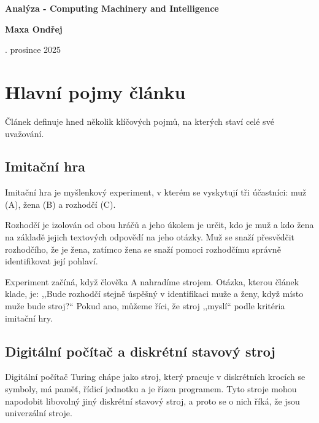 \documentclass[a4paper,oneside,11pt,usenames,dvipsnames]{article}
\begin{document}
\thispagestyle{empty}
\begin {center}
	\vspace *{10mm}
	{\Huge \sffamily \bfseries Analýza - Computing Machinery and Intelligence}

	\vspace *{20mm}
	{\Large \sffamily \bfseries Maxa Ondřej}

	\vspace *{7.5mm}
	{\large {}. prosince 2025}
\end {center}

\begin{abstract}
	Článek ,,Computing Machinery and Intelligence`` (1950) představuje klíčový text zakládající oblast umělé inteligence. Zabývá se filozofickou otázku jestli ,,Mohou stroje myslet?{}`` a představuje nám Turingový test (v textu se používá slovní spojení ,,imitační hra``). Hlavní postavou hry je rozhodčí, který rozlišuje mezi odpověďmi člověka a stroje na základě textové komunikace. Dnes zůstává Turingův test ikonickou metrikou a položil základy pro současnou popularitu AI.
\end{abstract}

\setlength{\parskip}{1ex plus 0.25ex minus 0.125ex}
  
\section{Hlavní pojmy článku}
\label{sec:uvod}

Článek definuje hned několik klíčových pojmů, na kterých staví celé své uvažování.

\subsection{Imitační hra}
\label{subsec:imitacni-hra}
Imitační hra je myšlenkový experiment, v kterém se vyskytují tři účastníci: muž (A), žena (B) a rozhodčí (C).

Rozhodčí je izolován od obou hráčů a jeho úkolem je určit, kdo je muž a kdo žena na základě jejich textových odpovědí na jeho otázky. Muž se snaží přesvědčit rozhodčího, že je žena, zatímco žena se snaží pomoci rozhodčímu správně identifikovat její pohlaví.

Experiment začíná, když člověka A nahradíme strojem. Otázka, kterou článek klade, je: ,,Bude rozhodčí stejně úspěšný v identifikaci muže a ženy, když místo muže bude stroj?{}`` Pokud ano, můžeme říci, že stroj ,,myslí`` podle kritéria imitační hry.

\subsection{Digitální počítač a diskrétní stavový stroj}
\label{subsec:digitani-pocitac}
Digitální počítač Turing chápe jako stroj, který pracuje v diskrétních krocích se symboly, má paměť, řídicí jednotku a je řízen programem. Tyto stroje mohou napodobit libovolný jiný diskrétní stavový stroj, a proto se o nich říká, že jsou univerzální stroje.
\end{document}
